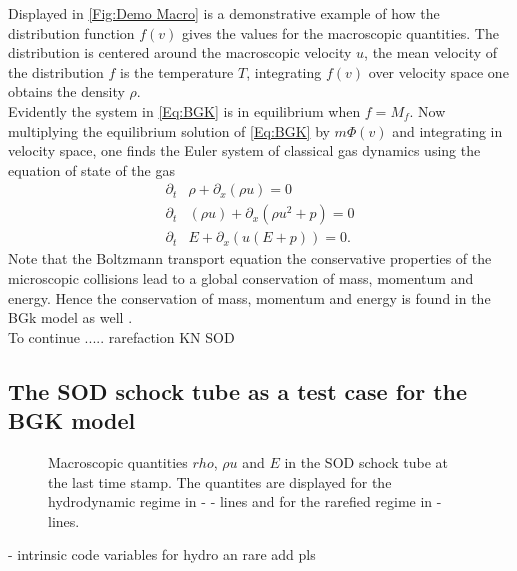 \documentclass[12pt, a4paper]{article}
\begin{document}
Displayed in \cref{Fig:Demo Macro} is a demonstrative example of how the distribution function \(f(v)\) gives the values for the macroscopic quantities. The distribution is centered around the macroscopic velocity \(u\), the mean velocity of the distribution \(f\) is the temperature \(T\), integrating \(f(v)\) over velocity space one obtains the density \(\rho\).\\
Evidently the system in \cref{Eq:BGK} is in equilibrium when \(f = M_f\). Now multiplying the equilibrium solution of \cref{Eq:BGK} by \(m\Phi(v)\) and integrating in velocity space, one finds the Euler system of classical gas dynamics using the equation of state of the gas \cite{puppo2019kinetic}
\begin{align}
	\partial_t&\rho + \partial_x(\rho u) = 0
	\\
	\partial_t&(\rho u) + \partial_x(\rho u^2 + p) = 0
	\\
	\partial_t&E + \partial_x(u(E+p)) = 0 \textrm{.}
\end{align} 
Note that the Boltzmann transport equation the conservative properties of the microscopic collisions lead to a global conservation of mass, momentum and energy. Hence the conservation of mass, momentum and energy is found in the BGk model as well \cite{puppo2019kinetic}.\\
To continue .....
rarefaction KN
SOD
\subsection{The SOD schock tube as a test case for the BGK model} \label{FeaturesSOD}
\begin{figure}[!htbp]
	
	\caption{Macroscopic quantities \(rho\), \(\rho u\) and \(E\) in the SOD schock tube at the last time stamp. The quantites are displayed for the hydrodynamic regime in - - lines and for the rarefied regime in - lines.}
\end{figure}
- intrinsic code variables for hydro an rare add pls
\end{document}

